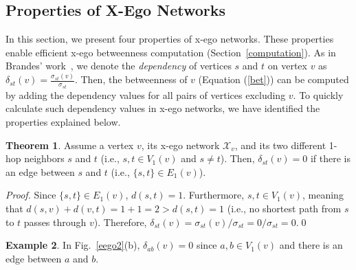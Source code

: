 \documentclass[preprint,12pt,authoryear]{elsarticle}
\newcommand{\D}[3]{\delta_{{#1}{#2}}({#3})}
\newcommand{\V}[2]{V_{#2}({#1})}
\newcommand{\E}[2]{E_{#2}({#1})}
\newcommand{\XN}[1]{\mathcal{X}_{{#1}}}
\newcommand{\BX}[1]{B^{\mathcal{X}}({#1})}
\theoremstyle{definition}
\newtheorem{theorem}{Theorem}[section]
\newtheorem{example}[theorem]{Example}
\begin{document}
\subsection{Properties of X-Ego Networks}\label{x-go_properties}
In this section, we present four properties of x-ego networks. 
These properties enable efficient x-ego betweenness computation (Section~\ref{computation}). 
As in Brandes' work~\cite{Brandes01afaster}, we denote the \emph{dependency} of vertices $s$ and $t$ on vertex $v$ as $\D{s}{t}{v} = \frac{\sigma_{st}(v)}{\sigma_{st}}$.
Then, the betweenness of $v$ (Equation (\ref{bet})) can be computed by adding the dependency values for all pairs of vertices excluding $v$.
To quickly calculate such dependency values in x-ego networks, we have identified the properties explained below. 

\begin{theorem}
\label{theorem1} 
Assume a vertex $v$, its x-ego network $\XN{v}$, and its two different 1-hop neighbors $s$ and $t$ (i.e., $s, t \in \V{v}{1}$ and $s \ne t$).
Then, $\D{s}{t}{v} = 0$ if there is an edge between $s$ and $t$ (i.e., $\{s, t\} \in \E{v}{1}$).
\begin{proof}
Since $\{s, t\} \in \E{v}{1}$, $d(s, t) = 1$.
Furthermore, $s, t \in \V{v}{1}$, meaning that $d(s, v) + d(v, t) = 1 + 1 = 2 > d(s, t) = 1$ (i.e., no shortest path from $s$ to $t$ passes through $v$).
Therefore, $\D{s}{t}{v} = \sigma_{st}(v)/\sigma_{st} = 0/\sigma_{st} = 0$.\hfill\qed
\end{proof}
\end{theorem}


\begin{example}
In Fig.~\ref{eego2}(b), $\D{a}{b}{v} = 0$ since $a, b \in \V{v}{1}$ and there is an edge between $a$ and $b$.
\end{example}

% 
\end{document}
